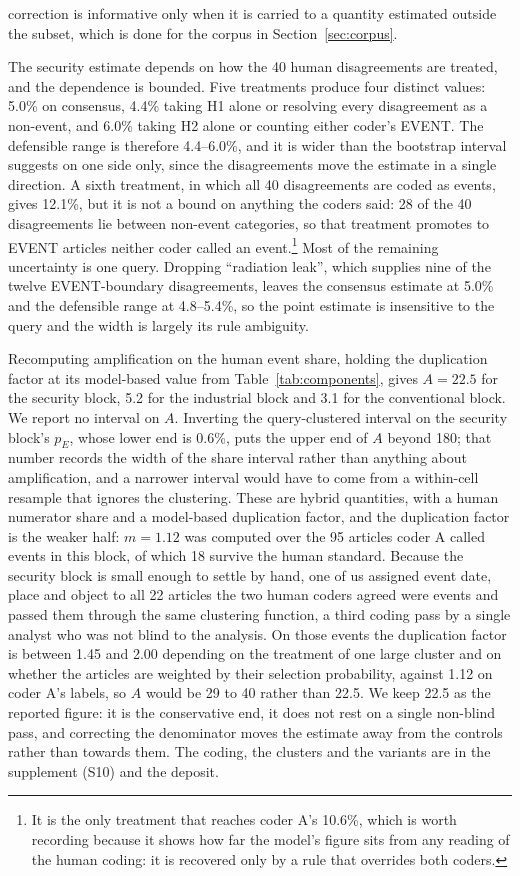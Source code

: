 \documentclass[1p,times]{elsarticle}
\begin{document}
correction is informative only when it is carried to a quantity estimated outside the subset, which is done for the corpus in Section~\ref{sec:corpus}.

The security estimate depends on how the 40 human disagreements are treated, and the dependence is bounded. Five treatments produce four distinct values: 5.0\% on consensus, 4.4\% taking H1 alone or resolving every disagreement as a non-event, and 6.0\% taking H2 alone or counting either coder's EVENT. The defensible range is therefore 4.4--6.0\%, and it is wider than the bootstrap interval suggests on one side only, since the disagreements move the estimate in a single direction. A sixth treatment, in which all 40 disagreements are coded as events, gives 12.1\%, but it is not a bound on anything the coders said: 28 of the 40 disagreements lie between non-event categories, so that treatment promotes to EVENT articles neither coder called an event.\footnote{It is the only treatment that reaches coder A's 10.6\%, which is worth recording because it shows how far the model's figure sits from any reading of the human coding: it is recovered only by a rule that overrides both coders.} Most of the remaining uncertainty is one query. Dropping ``radiation leak'', which supplies nine of the twelve EVENT-boundary disagreements, leaves the consensus estimate at 5.0\% and the defensible range at 4.8--5.4\%, so the point estimate is insensitive to the query and the width is largely its rule ambiguity.

Recomputing amplification on the human event share, holding the duplication factor at its model-based value from Table~\ref{tab:components}, gives $A = 22.5$ for the security block, 5.2 for the industrial block and 3.1 for the conventional block. We report no interval on $A$. Inverting the query-clustered interval on the security block's $p_E$, whose lower end is 0.6\%, puts the upper end of $A$ beyond 180; that number records the width of the share interval rather than anything about amplification, and a narrower interval would have to come from a within-cell resample that ignores the clustering. These are hybrid quantities, with a human numerator share and a model-based duplication factor, and the duplication factor is the weaker half: $m = 1.12$ was computed over the 95 articles coder A called events in this block, of which 18 survive the human standard. Because the security block is small enough to settle by hand, one of us assigned event date, place and object to all 22 articles the two human coders agreed were events and passed them through the same clustering function, a third coding pass by a single analyst who was not blind to the analysis. On those events the duplication factor is between 1.45 and 2.00 depending on the treatment of one large cluster and on whether the articles are weighted by their selection probability, against 1.12 on coder A's labels, so $A$ would be 29 to 40 rather than 22.5. We keep 22.5 as the reported figure: it is the conservative end, it does not rest on a single non-blind pass, and correcting the denominator moves the estimate away from the controls rather than towards them. The coding, the clusters and the variants are in the supplement (S10) and the deposit.
\end{document}
